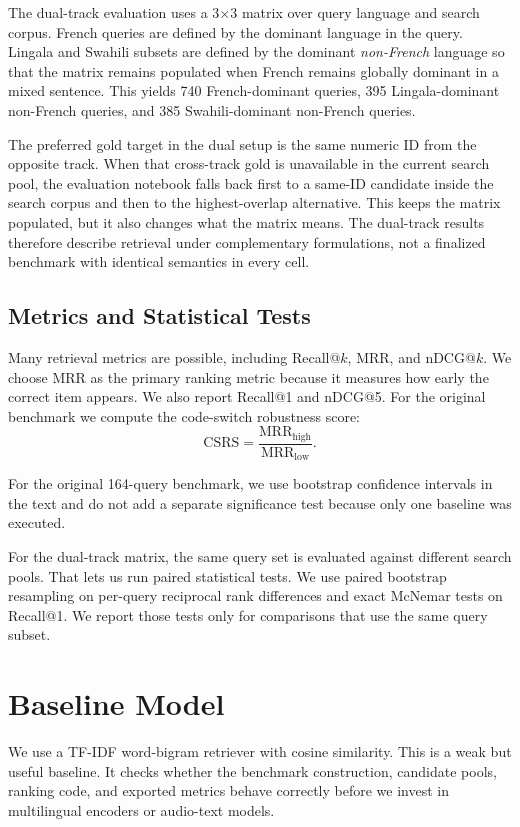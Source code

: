 \documentclass[11pt,twocolumn]{article}
\begin{document}
The dual-track evaluation uses a 3$\times$3 matrix over query language and search corpus. French queries are defined by the dominant language in the query. Lingala and Swahili subsets are defined by the dominant \emph{non-French} language so that the matrix remains populated when French remains globally dominant in a mixed sentence. This yields 740 French-dominant queries, 395 Lingala-dominant non-French queries, and 385 Swahili-dominant non-French queries.

The preferred gold target in the dual setup is the same numeric ID from the opposite track. When that cross-track gold is unavailable in the current search pool, the evaluation notebook falls back first to a same-ID candidate inside the search corpus and then to the highest-overlap alternative. This keeps the matrix populated, but it also changes what the matrix means. The dual-track results therefore describe retrieval under complementary formulations, not a finalized benchmark with identical semantics in every cell.

\subsection{Metrics and Statistical Tests}
Many retrieval metrics are possible, including Recall@$k$, MRR, and nDCG@$k$. We choose MRR as the primary ranking metric because it measures how early the correct item appears. We also report Recall@1 and nDCG@5. For the original benchmark we compute the code-switch robustness score:
\begin{equation}
\mathrm{CSRS}=\frac{\mathrm{MRR}_{\mathrm{high}}}{\mathrm{MRR}_{\mathrm{low}}}.
\end{equation}

For the original 164-query benchmark, we use bootstrap confidence intervals in the text and do not add a separate significance test because only one baseline was executed.

For the dual-track matrix, the same query set is evaluated against different search pools. That lets us run paired statistical tests. We use paired bootstrap resampling on per-query reciprocal rank differences and exact McNemar tests on Recall@1. We report those tests only for comparisons that use the same query subset.

\section{Baseline Model}
We use a TF-IDF word-bigram retriever with cosine similarity. This is a weak but useful baseline. It checks whether the benchmark construction, candidate pools, ranking code, and exported metrics behave correctly before we invest in multilingual encoders or audio-text models.
\end{document}
